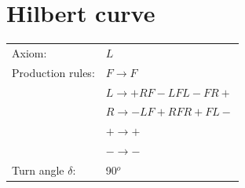 \documentclass[11pt]{article}
\begin{document}
\section{Hilbert curve}

\begin{tabular}{ll}
Axiom: & $L$ \\
Production rules: & $F \to F$ \\
& $L \to + R F - L F L - F R +$ \\
& $R \to - L F + R F R + F L -$ \\
& $+ \to +$ \\
& $- \to -$ \\
Turn angle $\delta$: & 90$^o$ \\
\end{tabular}


\begin{figure}[H]
  \centering

  \hfill
  \hfill


\end{figure}
\end{document}
